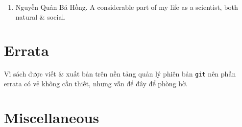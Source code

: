 \documentclass{article}
\begin{document}
\begin{enumerate}
	\item {\sc Nguyễn Quản Bá Hồng.} A considerable part of my life as a scientist, both natural \& social.
\end{enumerate}


\section{Errata}
Vì sách được viết \& xuất bản trên nền tảng quản lý phiên bản {\tt git} nên phần errata có vẻ không cần thiết, nhưng vẫn để đây để phòng hờ.


\section{Miscellaneous}


\printbibliography[heading=bibintoc]
	
\end{document}
